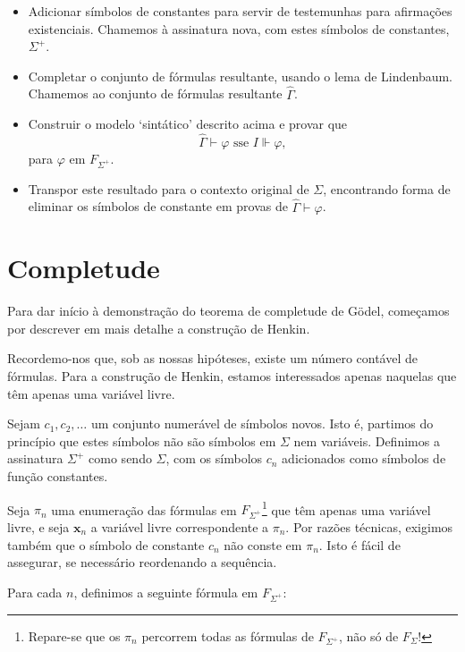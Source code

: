 \documentclass{report}
\theoremstyle{definition}
\theoremstyle{remark}
\renewcommand{\bf}[1]{\mathbf{#1}}
\begin{document}
	\begin{itemize}
	\item Adicionar símbolos de constantes para servir de testemunhas para afirmações existenciais. Chamemos à assinatura nova, com estes símbolos de constantes, $\Sigma^+$.
	
	\item Completar o conjunto de fórmulas resultante, usando o lema de Lindenbaum. Chamemos ao conjunto de fórmulas resultante $\widehat\Gamma$.
	
	\item Construir o modelo `sintático' descrito acima e provar que
	\[\widehat\Gamma \vdash \varphi \text{ sse } I \Vdash \varphi,\]
	para $\varphi$ em $F_{\Sigma^+}$.
	
	\item Transpor este resultado para o contexto original de $\Sigma$, encontrando forma de eliminar os símbolos de constante em provas de $\widehat\Gamma \vdash \varphi$.
	\end{itemize}
	
	\section{Completude}
	
	Para dar início à demonstração do teorema de completude de Gödel, começamos por descrever em mais detalhe a construção de Henkin.
	
	Recordemo-nos que, sob as nossas hipóteses, existe um número contável de fórmulas. Para a construção de Henkin, estamos interessados apenas naquelas que têm apenas uma variável livre.
	
	Sejam $c_1, c_2, \dots$ um conjunto numerável de símbolos novos. Isto é, partimos do princípio que estes símbolos não são símbolos em $\Sigma$ nem variáveis. Definimos a assinatura $\Sigma^+$ como sendo $\Sigma$, com os símbolos $c_n$ adicionados como símbolos de função constantes.
	
	Seja $\pi_n$ uma enumeração das fórmulas em $F_{\Sigma^+}$\footnote{Repare-se que os $\pi_n$ percorrem todas as fórmulas de $F_{\Sigma^+}$, não só de $F_\Sigma$!} que têm apenas uma variável livre, e seja $\bf x_n$ a variável livre correspondente a $\pi_n$. Por razões técnicas, exigimos também que o símbolo de constante $c_n$ não conste em $\pi_n$. Isto é fácil de assegurar, se necessário reordenando a sequência.
	
	Para cada $n$, definimos a seguinte fórmula em $F_{\Sigma^+}$:
	
\end{document}
